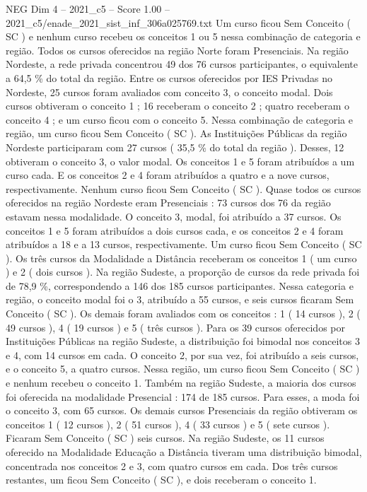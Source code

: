 \begin{textsample}{NEG Dim 4 – 2021\_c5 – Score 1.00 – 2021\_c5/enade\_2021\_sist\_inf\_306a025769.txt}
Um curso ficou Sem Conceito ( SC ) e nenhum curso recebeu os conceitos 1 ou 5 nessa combinação de categoria e região.
Todos os cursos oferecidos na região Norte foram Presenciais.
Na região Nordeste, a rede privada concentrou 49 dos 76 cursos participantes, o equivalente a 64,5 \% do total da região.
Entre os cursos oferecidos por IES Privadas no Nordeste, 25 cursos foram avaliados com conceito 3, o conceito modal.
Dois cursos obtiveram o conceito 1 ; 16 receberam o conceito 2 ; quatro receberam o conceito 4 ; e um curso ficou com o conceito 5.
Nessa combinação de categoria e região, um curso ficou Sem Conceito ( SC ).
As Instituições Públicas da região Nordeste participaram com 27 cursos ( 35,5 \% do total da região ).
Desses, 12 obtiveram o conceito 3, o valor modal.
Os conceitos 1 e 5 foram atribuídos a um curso cada.
E os conceitos 2 e 4 foram atribuídos a quatro e a nove cursos, respectivamente.
Nenhum curso ficou Sem Conceito ( SC ).
Quase todos os cursos oferecidos na região Nordeste eram Presenciais : 73 cursos dos 76 da região estavam nessa modalidade.
O conceito 3, modal, foi atribuído a 37 cursos.
Os conceitos 1 e 5 foram atribuídos a dois cursos cada, e os conceitos 2 e 4 foram atribuídos a 18 e a 13 cursos, respectivamente.
Um curso ficou Sem Conceito ( SC ).
Os três cursos da Modalidade a Distância receberam os conceitos 1 ( um curso ) e 2 ( dois cursos ).
Na região Sudeste, a proporção de cursos da rede privada foi de 78,9 \%, correspondendo a 146 dos 185 cursos participantes.
Nessa categoria e região, o conceito modal foi o 3, atribuído a 55 cursos, e seis cursos ficaram Sem Conceito ( SC ).
Os demais foram avaliados com os conceitos : 1 ( 14 cursos ), 2 ( 49 cursos ), 4 ( 19 cursos ) e 5 ( três cursos ).
Para os 39 cursos oferecidos por Instituições Públicas na região Sudeste, a distribuição foi bimodal nos conceitos 3 e 4, com 14 cursos em cada.
O conceito 2, por sua vez, foi atribuído a seis cursos, e o conceito 5, a quatro cursos.
Nessa região, um curso ficou Sem Conceito ( SC ) e nenhum recebeu o conceito 1.
Também na região Sudeste, a maioria dos cursos foi oferecida na modalidade Presencial : 174 de 185 cursos.
Para esses, a moda foi o conceito 3, com 65 cursos.
Os demais cursos Presenciais da região obtiveram os conceitos 1 ( 12 cursos ), 2 ( 51 cursos ), 4 ( 33 cursos ) e 5 ( sete cursos ).
Ficaram Sem Conceito ( SC ) seis cursos.
Na região Sudeste, os 11 cursos oferecido na Modalidade Educação a Distância tiveram uma distribuição bimodal, concentrada nos conceitos 2 e 3, com quatro cursos em cada.
Dos três cursos restantes, um ficou Sem Conceito ( SC ), e dois receberam o conceito 1.

\end{textsample}
